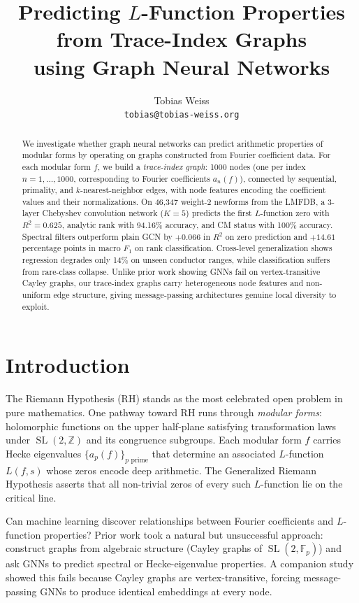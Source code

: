 \documentclass[11pt]{article}
\title{Predicting $L$-Function Properties from Trace-Index Graphs\\
using Graph Neural Networks}
\author{Tobias Weiss \\ \texttt{tobias@tobias-weiss.org}}
\date{}
\DeclareMathOperator{\SL}{SL}
\newcommand{\Fp}{\mathbb{F}_p}
\newcommand{\Z}{\mathbb{Z}}
\begin{document}
\maketitle

\begin{abstract}
We investigate whether graph neural networks can predict arithmetic properties of modular forms by operating on graphs constructed from Fourier coefficient data. For each modular form $f$, we build a \emph{trace-index graph}: 1000 nodes (one per index $n = 1, \ldots, 1000$, corresponding to Fourier coefficients $a_n(f)$), connected by sequential, primality, and $k$-nearest-neighbor edges, with node features encoding the coefficient values and their normalizations. On 46,347 weight-2 newforms from the LMFDB, a 3-layer Chebyshev convolution network ($K=5$) predicts the first $L$-function zero with $R^2 = 0.625$, analytic rank with 94.16\% accuracy, and CM status with 100\% accuracy. Spectral filters outperform plain GCN by $+0.066$ in $R^2$ on zero prediction and $+14.61$ percentage points in macro $F_1$ on rank classification. Cross-level generalization shows regression degrades only 14\% on unseen conductor ranges, while classification suffers from rare-class collapse. Unlike prior work showing GNNs fail on vertex-transitive Cayley graphs, our trace-index graphs carry heterogeneous node features and non-uniform edge structure, giving message-passing architectures genuine local diversity to exploit.
\end{abstract}

\section{Introduction}
\label{sec:intro}

The Riemann Hypothesis (RH) stands as the most celebrated open problem in pure mathematics. One pathway toward RH runs through \emph{modular forms}: holomorphic functions on the upper half-plane satisfying transformation laws under $\SL(2,\Z)$ and its congruence subgroups. Each modular form $f$ carries Hecke eigenvalues $\{a_p(f)\}_{p \text{ prime}}$ that determine an associated $L$-function $L(f,s)$ whose zeros encode deep arithmetic. The Generalized Riemann Hypothesis asserts that all non-trivial zeros of every such $L$-function lie on the critical line.

Can machine learning discover relationships between Fourier coefficients and $L$-function properties? Prior work took a natural but unsuccessful approach: construct graphs from algebraic structure (Cayley graphs of $\SL(2,\Fp)$) and ask GNNs to predict spectral or Hecke-eigenvalue properties. A companion study \citep{companion2025} showed this fails because Cayley graphs are vertex-transitive, forcing message-passing GNNs to produce identical embeddings at every node.
\end{document}

